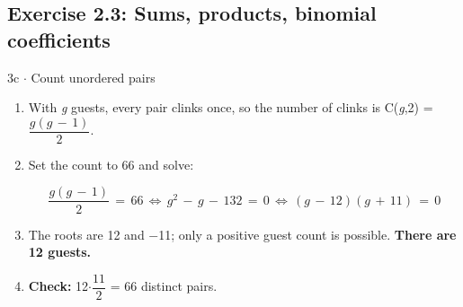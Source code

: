 \documentclass[11pt]{article}
\begin{document}
\begin{keepsection}\subsection{Exercise 2.3: Sums, products, binomial coefficients}

\begin{workedbox}{3c \ensuremath{\cdot} Count unordered pairs}
\begin{enumerate}
\item With \textit{g} guests, every pair clinks once, so the number of clinks is C(\textit{g},2) = {\small\ensuremath{\dfrac{{g}({g}\, -\, 1)}{2}}}.
\item {}
Set the count to 66 and solve:

\begin{equation*}\dfrac{{g}({g}\, -\, 1)}{2}\, =\, 66\, \Leftrightarrow \, {g}^{2}\, -\, {g}\, -\, 132\, =\, 0\, \Leftrightarrow \, ({g}\, -\, 12)({g}\, +\, 11)\, =\, 0\end{equation*}
\item The roots are 12 and \ensuremath{-}11; only a positive guest count is possible. \textbf{There are 12 guests.}
\item \textbf{Check:} 12\ensuremath{\cdot}{\small\ensuremath{\dfrac{11}{2}}} = 66 distinct pairs.
\end{enumerate}
\end{workedbox}

\end{keepsection}
\end{document}
